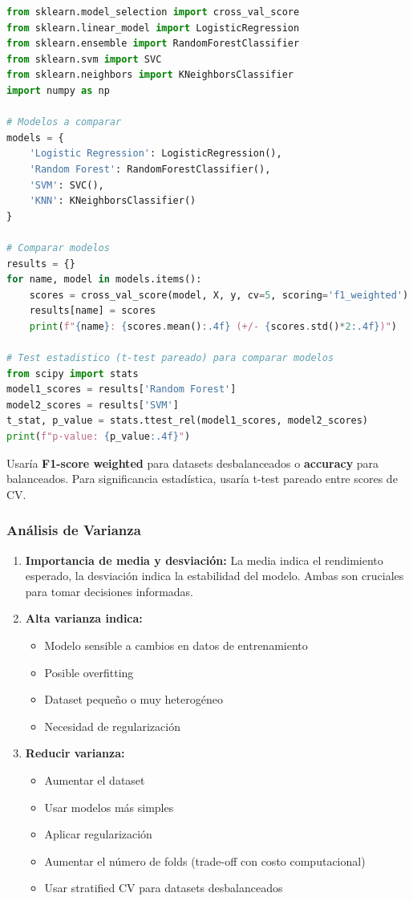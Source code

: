 \documentclass[12pt]{article}
\begin{document}
\begin{lstlisting}[language=Python]
from sklearn.model_selection import cross_val_score
from sklearn.linear_model import LogisticRegression
from sklearn.ensemble import RandomForestClassifier
from sklearn.svm import SVC
from sklearn.neighbors import KNeighborsClassifier
import numpy as np

# Modelos a comparar
models = {
    'Logistic Regression': LogisticRegression(),
    'Random Forest': RandomForestClassifier(),
    'SVM': SVC(),
    'KNN': KNeighborsClassifier()
}

# Comparar modelos
results = {}
for name, model in models.items():
    scores = cross_val_score(model, X, y, cv=5, scoring='f1_weighted')
    results[name] = scores
    print(f"{name}: {scores.mean():.4f} (+/- {scores.std()*2:.4f})")

# Test estadistico (t-test pareado) para comparar modelos
from scipy import stats
model1_scores = results['Random Forest']
model2_scores = results['SVM'] 
t_stat, p_value = stats.ttest_rel(model1_scores, model2_scores)
print(f"p-value: {p_value:.4f}")
\end{lstlisting}

Usaría \textbf{F1-score weighted} para datasets desbalanceados o \textbf{accuracy} para balanceados. Para significancia estadística, usaría t-test pareado entre scores de CV.

\subsubsection{Análisis de Varianza}

\begin{enumerate}
    \item \textbf{Importancia de media y desviación:} La media indica el rendimiento esperado, la desviación indica la estabilidad del modelo. Ambas son cruciales para tomar decisiones informadas.
    
    \item \textbf{Alta varianza indica:}
    \begin{itemize}
        \item Modelo sensible a cambios en datos de entrenamiento
        \item Posible overfitting
        \item Dataset pequeño o muy heterogéneo
        \item Necesidad de regularización
    \end{itemize}
    
    \item \textbf{Reducir varianza:}
    \begin{itemize}
        \item Aumentar el dataset
        \item Usar modelos más simples
        \item Aplicar regularización
        \item Aumentar el número de folds (trade-off con costo computacional)
        \item Usar stratified CV para datasets desbalanceados
    \end{itemize}
\end{enumerate}
\end{document}
